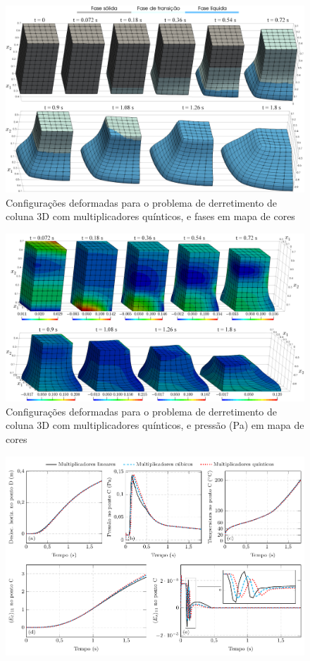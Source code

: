 \documentclass[Tese.tex]{subfiles}
\begin{document}
\begin{figure}[!htb]
	\centering
	\caption{Configurações deformadas para o problema de derretimento de coluna 3D com multiplicadores quínticos, e fases em mapa de cores}
	\label{fig:PhaseChangeDam3D-phase}
	\includegraphics[width=\textwidth]{Figuras/PhaseChangeDam3D/phase.png}
\end{figure}

\begin{figure}[!htb]
	\centering
	\caption{Configurações deformadas para o problema de derretimento de coluna 3D com multiplicadores quínticos, e pressão (Pa) em mapa de cores}
	\label{fig:PhaseChangeDam3D-pressure}
	\includegraphics[width=\textwidth]{Figuras/PhaseChangeDam3D/pressure.png}
\end{figure}

\begin{figure}[!htb]
	\centering
	\caption{}
	\label{fig:PhaseChangeDamSolidToLiquid3D-multipliers}
	\includegraphics[scale=1.0]{Figuras/PhaseChangeDam3D/multipliers.pdf}
\end{figure}
\end{document}
